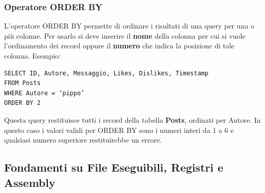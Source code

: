 \documentclass{article}
\begin{document}
\subsubsection{Operatore ORDER BY}
L'operatore ORDER BY permette di ordinare i risultati di una query per una o più colonne. Per usarlo si deve inserire il \textbf{nome} della colonna per cui si vuole l'ordinamento dei record oppure il \textbf{numero} che indica la posizione di tale colonna. Esempio:
\begin{verbatim}
SELECT ID, Autore, Messaggio, Likes, Dislikes, Timestamp 
FROM Posts 
WHERE Autore = ‘pippo’ 
ORDER BY 2
\end{verbatim}
Questa query restituisce tutti i record della tabella \textbf{Posts}, ordinati per Autore. In questo caso i valori validi per ORDER BY sono i numeri interi da 1 a 6 e qualsiasi numero superiore restituirebbe un errore.

\newpage

\subsection{Fondamenti su File Eseguibili, Registri e Assembly}
\end{document}
